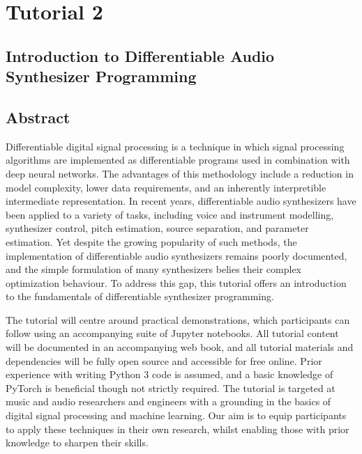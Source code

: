 \clearpage


\section*{Tutorial 2}
{}
%
\subsection*{Introduction to Differentiable Audio Synthesizer Programming}

\subsection*{Abstract}
Differentiable digital signal processing is a technique in which signal processing algorithms are implemented as differentiable programs used in combination with deep neural networks. The advantages of this methodology include a reduction in model complexity, lower data requirements, and an inherently interpretible intermediate representation. In recent years, differentiable audio synthesizers have been applied to a variety of tasks, including voice and instrument modelling, synthesizer control, pitch estimation, source separation, and parameter estimation. Yet despite the growing popularity of such methods, the implementation of differentiable audio synthesizers remains poorly documented, and the simple formulation of many synthesizers belies their complex optimization behaviour. To address this gap, this tutorial offers an introduction to the fundamentals of differentiable synthesizer programming.

The tutorial will centre around practical demonstrations, which participants can follow using an accompanying suite of Jupyter notebooks. All tutorial content will be documented in an accompanying web book, and all tutorial materials and dependencies will be fully open source and accessible for free online. Prior experience with writing Python 3 code is assumed, and a basic knowledge of PyTorch is beneficial though not strictly required. The tutorial is targeted at music and audio researchers and engineers with a grounding in the basics of digital signal processing and machine learning. Our aim is to equip participants to apply these techniques in their own research, whilst enabling those with prior knowledge to sharpen their skills.


